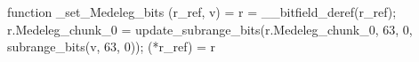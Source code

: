 function _set_Medeleg_bits (r_ref, v) = {
    r = __bitfield_deref(r_ref);
    r.Medeleg_chunk_0 = update_subrange_bits(r.Medeleg_chunk_0, 63, 0, subrange_bits(v, 63, 0));
    (*r_ref) = r
}
